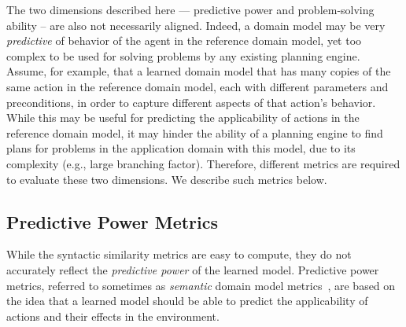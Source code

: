\documentclass{article}
\theoremstyle{definition}
\theoremstyle{remark}
\newcommand{\roni}[1]{{\textcolor{red}{[Roni: #1]}}}
\begin{document}
The two dimensions described here --- predictive power and problem-solving ability -- are also not necessarily aligned. Indeed, a domain model may be very \emph{predictive} of behavior of the agent in the reference domain model, yet too complex to be used for solving problems by any existing planning engine.
Assume, for example, that a learned domain model that has many copies of the same action in the reference domain model, each with different parameters and preconditions, in order to capture different aspects of that action's behavior. 
While this may be useful for predicting the applicability of actions in the reference domain model, 
it may hinder the ability of a planning engine to find plans for problems in the application domain with this model, due to its complexity (e.g., large branching factor). 
Therefore, different metrics are required to evaluate these two dimensions. We describe such metrics below. 



\subsection{Predictive Power Metrics}
\label{sec:predictiveness-metrics}
While the syntactic similarity metrics are easy to compute, they do not accurately reflect the \emph{predictive power} of the learned model. 
Predictive power metrics, referred to sometimes as \emph{semantic} domain model metrics~\citep{aineto2019learning,mordoch2024safe,le2024learning}, are based on the idea that a learned model should be able to predict the applicability of actions and their effects in the environment. 
\end{document}
